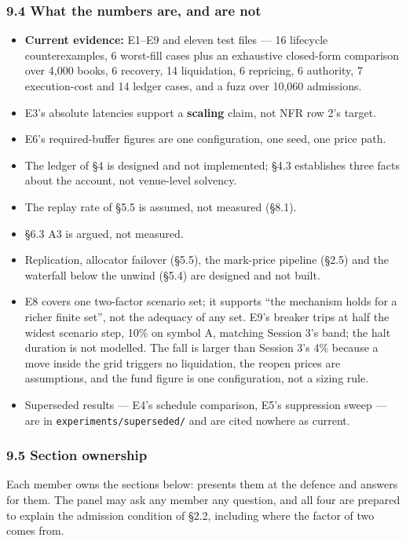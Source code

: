 \documentclass[10pt,a4paper]{article}
\providecommand{\tightlist}{\setlength{\itemsep}{0pt}\setlength{\parskip}{0pt}}
\begin{document}
\subsubsection{9.4 What the numbers are, and are not}\label{what-the-numbers-are-and-are-not}

\begin{itemize}
\tightlist
\item
  \textbf{Current evidence:} E1--E9 and eleven test files --- 16 lifecycle
  counterexamples, 6 worst-fill cases plus an exhaustive closed-form comparison
  over 4,000 books, 6 recovery, 14 liquidation, 6 repricing, 6 authority, 7
  execution-cost and 14 ledger cases, and a fuzz over 10,060 admissions.
\item
  E3's absolute latencies support a \textbf{scaling} claim, not NFR row 2's target.
\item
  E6's required-buffer figures are one configuration, one seed, one price path.
\item
  The ledger of §4 is designed and not implemented; §4.3 establishes three facts
  about the account, not venue-level solvency.
\item
  The replay rate of §5.5 is assumed, not measured (§8.1).
\item
  §6.3 A3 is argued, not measured.
\item
  Replication, allocator failover (§5.5), the mark-price pipeline (§2.5) and the
  waterfall below the unwind (§5.4) are designed and not built.
\item
  E8 covers one two-factor scenario set; it supports ``the mechanism holds for a
  richer finite set'', not the adequacy of any set. E9's breaker trips at half the
  widest scenario step, 10\% on symbol A, matching Session 3's band; the halt
  duration is not modelled. The fall is larger than Session 3's 4\% because a move
  inside the grid triggers no liquidation, the reopen prices are assumptions, and
  the fund figure is one configuration, not a sizing rule.
\item
  Superseded results --- E4's schedule comparison, E5's suppression sweep --- are in
  \texttt{experiments/superseded/} and are cited nowhere as current.
\end{itemize}

\subsubsection{9.5 Section ownership}\label{section-ownership}

Each member owns the sections below: presents them at the defence and answers
for them. The panel may ask any member any question, and all four are prepared
to explain the admission condition of §2.2, including where the factor of two
comes from.
\end{document}
